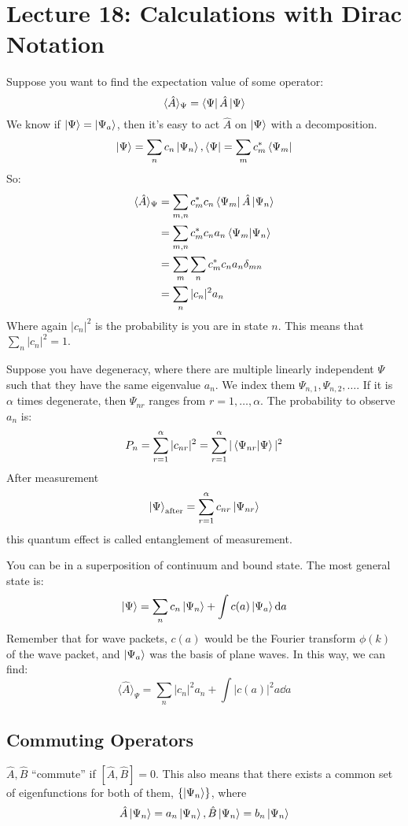 \section{Lecture 18: Calculations with Dirac Notation}

Suppose you want to find the expectation value of some operator:
\[ \langle \hat{A} \rangle_{\Psi} = \bra{\Psi} \hat{A} \ket{\Psi} \]
We know if $\ket{\Psi} = \ket{\Psi_a}$, then it's easy to act $\hat{A}$ on
$\ket{\Psi}$ with a decomposition.
\[ \ket{\Psi} = \sum_n c_n \ket{\Psi_n}, \bra{\Psi} = \sum_m c_m^* \bra{\Psi_m} \]
So:
\begin{align*}
    \langle \hat{A} \rangle_{\Psi} &= \sum_{m, n} c_m^* c_n \bra{\Psi_m} \hat{A} \ket{\Psi_n} \\
    &= \sum_{m, n} c_m^* c_n a_n \bra{\Psi_m}\ket{\Psi_n} \\
    &= \sum_{m} \sum_{n} c_m^* c_n a_n \delta_{mn} \\
    &= \sum_n |c_n|^2 a_n
\end{align*}
Where again $|c_n|^2$ is the probability is you are in state $n$.
This means that $\sum_n |c_n|^2 = 1$.

Suppose you have degeneracy, where there are multiple linearly independent
$\Psi$ such that they have the same eigenvalue $a_n$. We index them $\Psi_{n, 1}, \Psi_{n, 2}, \dots$.
If it is $\alpha$ times degenerate, then $\Psi_{nr}$ ranges from $r = 1, \dots, \alpha$.
The probability to observe $a_n$ is:
\[ P_n = \sum_{r = 1}^{\alpha} |c_{nr}|^2 = \sum_{r = 1}^{\alpha} |\bra{\Psi_{nr}}\ket{\Psi}|^2 \]
After measurement
\[ \ket{\Psi}_{\text{after}} = \sum_{r = 1}^{\alpha} c_{nr} \ket{\Psi_{nr}} \] 
this quantum effect is called entanglement of measurement.

You can be in a superposition of continuum and bound state. The most general state is:
\[ \ket{\Psi} = \sum_n c_n \ket{\Psi_n} + \int c(a) \ket{\Psi_a} \dd{a} \]
Remember that for wave packets, $c(a)$ would be the Fourier transform $\phi(k)$ of the wave packet, and
$\ket{\Psi_a}$ was the basis of plane waves. In this way, we can find:
\[ \langle \hat{A} \rangle_{\Psi} = \sum_{n} |c_n|^2 a_n + \int |c(a)|^2 a \dd{a} \]

\subsection{Commuting Operators}
$\hat{A}, \hat{B}$ ``commute'' if $[\hat{A}, \hat{B}] = 0$. This also means that there
exists a common set of eigenfunctions for both of them, $\{ \ket{\Psi_n}\}$, where
\[ \hat{A}\ket{\Psi_n} = a_n \ket{\Psi_n}, \hat{B} \ket{\Psi_n} = b_n \ket{\Psi_n} \]

